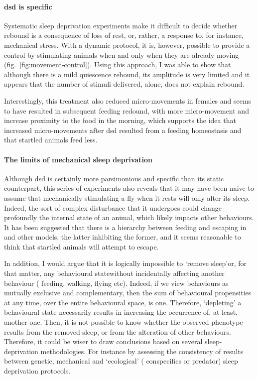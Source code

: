 \paragraph*{\gls{dsd} is specific}

Systematic sleep deprivation experiments make it difficult to decide whether rebound is a consequence of loss of rest, 
or, rather, a response to, for instance, mechanical stress. 
With a dynamic protocol, it is, however, possible to provide a control by stimulating animals when and only when they are already moving (fig.~\ref{fig:movement-control}).
Using this approach, I was able to show that 
although there is a mild quiescence rebound, its amplitude is very limited and it appears that
the number of stimuli delivered, alone, does not explain rebound.

Interestingly, this treatment also reduced micro-movements in females and seems to have resulted in subsequent feeding redound, with more micro-movement and increase proximity to the food in the morning, 
which supports the idea that increased micro-movements after \gls{dsd} resulted from a feeding homeostasis and that startled animals feed less.

\paragraph*{The limits of mechanical sleep deprivation}
Although \gls{dsd} is certainly more parsimonious and specific than its static counterpart, this series of experiments also reveals that it may have been naive to assume that mechanically stimulating a fly when it rests will only alter its sleep.
Indeed, the sort of complex disturbance that it undergoes could change profoundly the internal state of an animal, which likely impacts other behaviours.
It has been suggested that there is a hierarchy between feeding and escaping in \droso{} and other models, the latter inhibiting the former\cite{mann_pair_2013}, and it seems reasonable to think that startled animals will attempt to escape.

In addition, I would argue that it is logically impossible to `remove sleep'\emd{}or, for that matter, any behavioural state\emd{}without incidentally affecting another behaviour (\eg{} feeding, walking, flying etc).
Indeed, if we view behaviours as mutually exclusive and complementary, then the sum of behavioural propensities at any time, over the entire behavioural space, is one.
Therefore, `depleting' a behavioural state necessarily results in increasing the occurrence of, at least, another one.
Then, it is not possible to know whether the observed phenotype results from the removed sleep, or from the alteration of other behaviours.
Therefore, it could be wiser to draw conclusions based on several sleep-deprivation methodologies. 
For instance by assessing the consistency of results  between genetic, mechanical and `ecological' (\ie{} conspecifics or predator) sleep deprivation protocols.



